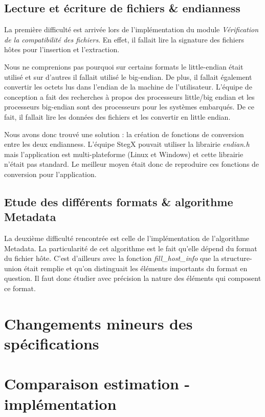 \documentclass[11pt]{article}
\begin{document}
\subsection{Lecture et écriture de fichiers \& endianness}

La première difficulté est arrivée lors de l'implémentation du module 
\textit{Vérification de la compatibilité des fichiers}. En effet, il fallait 
lire la signature des fichiers hôtes pour l'insertion et l'extraction. 

Nous ne comprenions pas pourquoi sur certains formats le little-endian 
était utilisé et sur d'autres il fallait utilisé le big-endian. 
De plus, il fallait également convertir les octets lus dans l'endian de la 
machine de l'utilisateur. L'équipe de conception a fait des recherches à 
propos des processeurs little/big endian et les processeurs big-endian sont 
des processeurs pour les systèmes embarqués. De ce fait, il fallait lire 
les données des fichiers et les convertir en little endian. 

Nous avons donc trouvé une solution : la création de fonctions de 
conversion entre les deux endianness. L'équipe StegX pouvait utiliser la 
librairie \textit{endian.h} mais l'application est multi-plateforme (Linux 
et Windows) et cette librairie n'était pas standard. Le meilleur moyen était 
donc de reproduire ces fonctions de conversion pour l'application. 

\subsection{Etude des différents formats \& algorithme Metadata}

La deuxième difficulté rencontrée est celle de l'implémentation de 
l'algorithme Metadata. La particularité de cet algorithme est le fait 
qu'elle dépend du format du fichier hôte. C'est d'ailleurs avec la fonction 
\textit{fill\_host\_info} que la structure-union était remplie et qu'on 
distinguait les éléments importants du format en question.  
Il faut donc étudier avec précision la nature des éléments qui composent
ce format.  

\section{Changements mineurs des spécifications}

\section{Comparaison estimation - implémentation}
\end{document}
